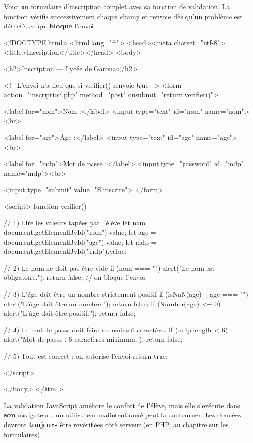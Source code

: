 Voici un formulaire d'inscription complet avec sa fonction de validation. La
fonction vérifie successivement chaque champ et renvoie  dès qu'un
problème est détecté, ce qui \textbf{bloque} l'envoi.

\begin{codehtml}
<!DOCTYPE html>
<html lang="fr">
<head><meta charset="utf-8"><title>Inscription</title></head>
<body>

<h2>Inscription — Lycée de Garoua</h2>

<!-- L'envoi n'a lieu que si verifier() renvoie true -->
<form action="inscription.php" method="post"
      onsubmit="return verifier()">

  <label for="nom">Nom :</label>
  <input type="text" id="nom" name="nom"><br>

  <label for="age">Âge :</label>
  <input type="text" id="age" name="age"><br>

  <label for="mdp">Mot de passe :</label>
  <input type="password" id="mdp" name="mdp"><br>

  <input type="submit" value="S'inscrire">
</form>

<script>
  function verifier() {
    // 1) Lire les valeurs tapées par l'élève
    let nom = document.getElementById("nom").value;
    let age = document.getElementById("age").value;
    let mdp = document.getElementById("mdp").value;

    // 2) Le nom ne doit pas être vide
    if (nom === "") {
      alert("Le nom est obligatoire.");
      return false;          // on bloque l'envoi
    }

    // 3) L'âge doit être un nombre strictement positif
    if (isNaN(age) || age === "") {
      alert("L'âge doit être un nombre.");
      return false;
    }
    if (Number(age) <= 0) {
      alert("L'âge doit être positif.");
      return false;
    }

    // 4) Le mot de passe doit faire au moins 6 caractères
    if (mdp.length < 6) {
      alert("Mot de passe : 6 caractères minimum.");
      return false;
    }

    // 5) Tout est correct : on autorise l'envoi
    return true;
  }
</script>

</body>
</html>
\end{codehtml}


\begin{attention}
La validation JavaScript améliore le confort de l'élève, mais elle s'exécute dans
\textbf{son} navigateur : un utilisateur malintentionné peut la contourner. Les
données devront \textbf{toujours} être revérifiées côté serveur (en PHP, au
chapitre sur les formulaires).
\end{attention}

